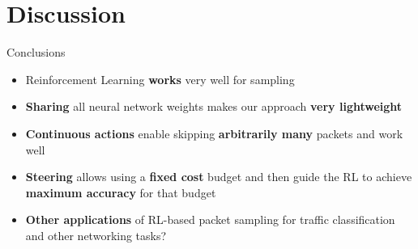 \documentclass[xcolor={dvipsnames}]{beamer}
\begin{document}
\section{Discussion}
\begin{frame}{Conclusions}
\begin{itemize}
\item Reinforcement Learning \textbf{works} very well for sampling
\item \textbf{Sharing} all neural network weights makes our approach \textbf{very lightweight}
\item \textbf{Continuous actions} enable skipping \textbf{arbitrarily many} packets and work well
\item \textbf{Steering} allows using a \textbf{fixed cost} budget and then guide the RL to achieve \textbf{maximum accuracy} for that budget
\item \textbf{Other applications} of RL-based packet sampling for traffic classification and other networking tasks?
\end{itemize}
\end{frame}

\makelastslide
\end{document}
